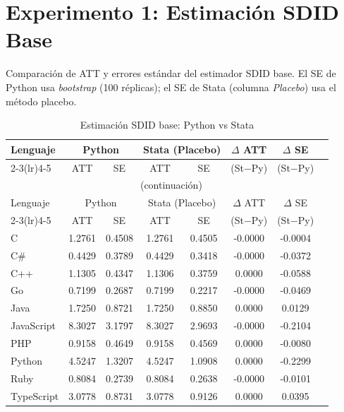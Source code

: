 \documentclass[12pt,a4paper]{article}
\begin{document}
\section{Experimento 1: Estimaci\'on SDID Base}

Comparaci\'on de ATT y errores est\'andar del estimador SDID base.
El SE de Python usa \textit{bootstrap} (100 r\'eplicas);
el SE de Stata (columna \textit{Placebo}) usa el m\'etodo placebo.

\begin{longtable}{lccccccc}
\caption{Estimaci\'on SDID base: Python vs Stata} \\
\toprule
Lenguaje & \multicolumn{2}{c}{\textcolor{pyblue}{Python}} & \multicolumn{2}{c}{\textcolor{statagreen}{Stata (Placebo)}} & $\Delta$ ATT & $\Delta$ SE \\
\cmidrule(lr){2-3}\cmidrule(lr){4-5}
& ATT & SE & ATT & SE & (St$-$Py) & (St$-$Py) \\
\midrule
\endfirsthead
\multicolumn{8}{c}{\tablename\ \thetable{} (continuaci\'on)} \\
\toprule
Lenguaje & \multicolumn{2}{c}{\textcolor{pyblue}{Python}} & \multicolumn{2}{c}{\textcolor{statagreen}{Stata (Placebo)}} & $\Delta$ ATT & $\Delta$ SE \\
\cmidrule(lr){2-3}\cmidrule(lr){4-5}
& ATT & SE & ATT & SE & (St$-$Py) & (St$-$Py) \\
\midrule
\endhead
\bottomrule
\endfoot
  C & 1.2761 & 0.4508 & 1.2761 & 0.4505 & -0.0000 & -0.0004 \\
  C\# & 0.4429 & 0.3789 & 0.4429 & 0.3418 & -0.0000 & -0.0372 \\
  C++ & 1.1305 & 0.4347 & 1.1306 & 0.3759 & 0.0000 & -0.0588 \\
  Go & 0.7199 & 0.2687 & 0.7199 & 0.2217 & -0.0000 & -0.0469 \\
  Java & 1.7250 & 0.8721 & 1.7250 & 0.8850 & 0.0000 & 0.0129 \\
  JavaScript & 8.3027 & 3.1797 & 8.3027 & 2.9693 & -0.0000 & -0.2104 \\
  PHP & 0.9158 & 0.4649 & 0.9158 & 0.4569 & 0.0000 & -0.0080 \\
  Python & 4.5247 & 1.3207 & 4.5247 & 1.0908 & 0.0000 & -0.2299 \\
  Ruby & 0.8084 & 0.2739 & 0.8084 & 0.2638 & -0.0000 & -0.0101 \\
  TypeScript & 3.0778 & 0.8731 & 3.0778 & 0.9126 & 0.0000 & 0.0395 \\
\end{longtable}
\end{document}

